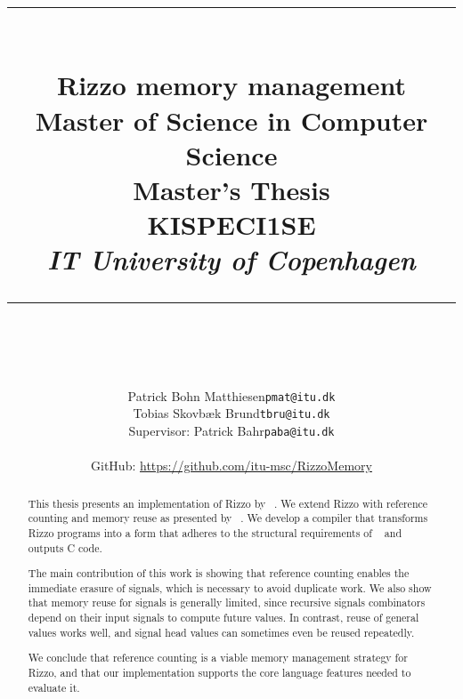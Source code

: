 \documentclass[12pt]{article}
\title{
  \rule{\textwidth}{0.5pt}\\[4mm]
  \huge{\textbf{Rizzo memory management}}\\[2mm]
  \large{Master of Science in Computer Science}\\
  \large{Master's Thesis}\\
  \large{KISPECI1SE}\\[4mm]
  \small{\textit{IT University of Copenhagen}}\\
  \rule{\textwidth}{0.5pt}\\
}
\author{
  \begin{tabular}{rr}
  Patrick Bohn Matthiesen & \texttt{pmat@itu.dk} \\
  Tobias Skovbæk Brund & \texttt{tbru@itu.dk} \\
  Supervisor: Patrick Bahr & \texttt{paba@itu.dk} \\
  \end{tabular}
  \\[4mm]
  \small{GitHub: \url{https://github.com/itu-msc/RizzoMemory}}
}
\begin{document}
\maketitle
\thispagestyle{empty}
\clearpage

\begin{abstract}

This thesis presents an implementation of Rizzo by \citeauthor{rizzo_modal_2025}~\cite{rizzo_modal_2025}. We extend Rizzo with reference counting and memory reuse as presented by \citeauthor{ullrich_counting_2021}~\cite{ullrich_counting_2021}.
We develop a compiler that transforms Rizzo programs into a form that adheres to the structural requirements of \citeauthor{ullrich_counting_2021}~\cite{ullrich_counting_2021} and outputs C code.

The main contribution of this work is showing that reference counting enables the immediate erasure of signals, which is necessary to avoid duplicate work.
We also show that memory reuse for signals is generally limited, since recursive signals combinators depend on their input signals to compute future values.
In contrast, reuse of general values works well, and signal head values can sometimes even be reused repeatedly.

We conclude that reference counting is a viable memory management strategy for Rizzo, and that our implementation supports the core language features needed to evaluate it.


\end{abstract}
\setcounter{page}{1}
\clearpage

\tableofcontents
\clearpage

\begin{sloppypar}
  \onehalfspacing{}
  \lstset{style=full}
  \clearpage
  \clearpage
  \clearpage
\end{sloppypar}

\printbibliography[title=References]
\clearpage

\appendix
{}
\lstset{style=appendix}

\end{document}
